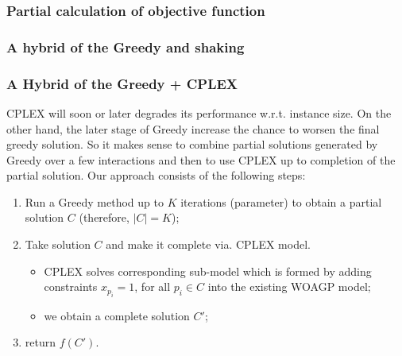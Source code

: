 \documentclass[runningheads,a4paper]{elsarticle}
\begin{document}
     \subsubsection{Partial calculation of objective function}
 
    \subsubsection{A hybrid of the Greedy and shaking}
    \subsubsection{A Hybrid of the Greedy + CPLEX}
        CPLEX will soon or later degrades its performance w.r.t. instance size. On the other hand, the later stage of Greedy increase the chance to worsen the final greedy solution.  So it makes sense to combine  partial solutions generated by  Greedy over a few interactions  and then to use CPLEX up to completion of the partial solution. Our approach consists of the following steps:
        \begin{enumerate}
        	\item Run a Greedy method up to $K$ iterations (parameter) to obtain a partial solution $C$ (therefore, $|C| = K$);
        	\item Take solution $C$ and make it complete via. CPLEX model.
        	\begin{itemize}
        		\item CPLEX solves corresponding sub-model which is formed by adding constraints $x_{p_i} = 1$, for all $p_i \in C$ into the existing WOAGP model;
        		\item we obtain a complete solution $C'$;
        	\end{itemize}
            \item return $f(C')$.
        \end{enumerate} 
    
      \begin{comment}

       \noindent \textbf{Improvements of the above method.} The above method can serve as a basic iteration
       of a more advanced techniques like ILP-LNS or CMSA. In this case, methods for destructing the solutions
       has to be proposed.  Underlying idea could be:
       \begin{itemize}
       	    \item remove $N$ guards with the largest costs out of $C'$
       	    \item remove $N$ guards which have a higher amount of points from $D(P)$ covered by other guards, represented by the function
       	    \begin{align}
       	       ratio(i) = \frac{\sum_{v \in V\setminus{ \{i\}}, j \in V(i)} 1_{j \mbox{ is veasible from } v} }{|V(i)|}.
       	    \end{align}
       \end{itemize}
      \end{comment}
\end{document}
